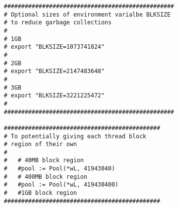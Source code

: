 \documentclass[letterpaper,12pt]{article}
\begin{document}
\begin{verbatim}
#################################################
# Optional sizes of environment varialbe BLKSIZE
# to reduce garbage collections
#
# 1GB
# export "BLKSIZE=1073741824"
#
# 2GB
# export "BLKSIZE=2147483648"
#
# 3GB
# export "BLKSIZE=3221225472"
#
#################################################

#############################################
# To potentially giving each thread block
# region of their own
#   
#   # 40MB block region
#   #pool := Pool(*wL, 41943040)
#   # 400MB block region
#   #pool := Pool(*wL, 419430400) 
#   #1GB block region
#############################################

\end{verbatim}
\end{document}
